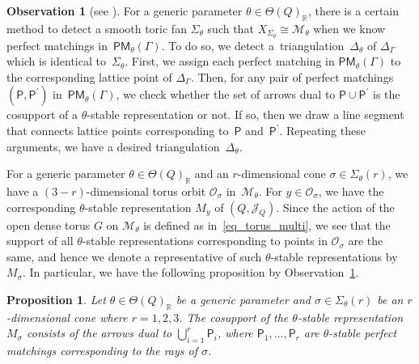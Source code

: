 \documentclass[10pt,a4paper]{amsart}
\numberwithin{equation}{section}
\newtheorem{Proposition}[Theorem]{Proposition}
\theoremstyle{definition}
\newtheorem{Observation}[Theorem]{Observation}
\newcommand{\RR}{\mathbb{R}}
\newcommand{\calJ}{\mathcal{J}}
\newcommand{\calM}{\mathcal{M}}
\newcommand{\calO}{\mathcal{O}}
\newcommand{\sfP}{\mathsf{P}}
\newcommand{\PM}{\mathsf{PM}}
\begin{document}
\begin{Observation}[{see \cite[Proposition~4.15 and the last part of Section~4]{Moz}}] \label{method_make_triangulation}
For a generic parameter $\theta\in\Theta(Q)_\RR$,
there is a certain method to detect a smooth toric fan $\Sigma_\theta$ such that ${X_{\Sigma_\theta}\cong\calM_\theta}$ when we know perfect matchings in~$\PM_\theta(\Gamma)$.
To do so, we detect a~triangulation~$\Delta_\theta$ of $\Delta_\Gamma$ which is identical to~$\Sigma_\theta$.
First, we assign each perfect matching in $\PM_\theta(\Gamma)$ to the corresponding lattice point of $\Delta_\Gamma$.
Then, for any pair of perfect matchings~$(\sfP,\sfP^\prime)$ in~$\PM_\theta(\Gamma)$, we check whether the set of arrows dual to $\sfP\cup \sfP^\prime$
is the cosupport of a $\theta$-stable representation or not.
If so, then we draw a line segment that connects lattice points corresponding to~$\sfP$ and~$\sfP^\prime$.
Repeating these arguments, we have a desired triangulation~$\Delta_\theta$.
\end{Observation}

For a generic parameter $\theta\in\Theta(Q)_\RR$ and an $r$-dimensional cone $\sigma\in\Sigma_\theta(r)$,
we have a $(3-r)$-dimensional torus orbit $\calO_\sigma$ in~$\calM_\theta$.
For $y\in\calO_\sigma$, we have the corresponding $\theta$-stable representation $M_y$ of $(Q, \calJ_Q)$.
Since the action of the open dense torus $G$ on $\calM_\theta$ is defined as in~\eqref{eq_torus_multi},
we see that the support of all $\theta$-stable representations corresponding to points in $\calO_\sigma$ are the same,
and hence we denote a representative of such $\theta$-stable representations by $M_\sigma$.
In particular, we have the following proposition by Observation~\ref{method_make_triangulation}.

\begin{Proposition}\label{prop_stablerep_cosupport}
Let $\theta\in\Theta(Q)_\RR$ be a generic parameter and $\sigma\in\Sigma_\theta(r)$ be an $r$-dimensional cone where $r=1,2,3$.
The cosupport of the $\theta$-stable representation $M_\sigma$
consists of the arrows dual to $\bigcup_{i=1}^r\sfP_i$, where $\sfP_1, \dots, \sfP_r$ are $\theta$-stable perfect matchings corresponding to the rays of $\sigma$.
\end{Proposition}
\end{document}
